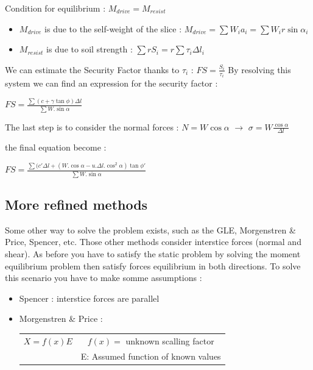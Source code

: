         Condition for equilibrium : $M_{drive} = M_{resist}$
        
        \begin{center}
        \begin{itemize}
            \item $M_{drive}$ is due to the self-weight of the slice : $M_{drive} = \sum W_i  a_i = \sum W_i  r \sin \alpha_i$
            \item $M_{resist}$ is due to soil strength : $\sum r S_i = r \sum \tau_i \Delta l_i$
        \end{itemize}
        \end{center}
        
        We can estimate the Security Factor thanks to $\tau_i$ : $FS = \frac{S_i}{\tau_i}$
        By resolving this system we can find an expression for the security factor : 
        
        \begin{center}
        $FS = \frac{\sum (c+\gamma \tan \phi) \Delta l}{\sum W . \sin \alpha}$ 
        \end{center}
        
        The last step is to consider the normal forces : $N = W \cos \alpha$  $\to$ $\sigma = W \frac{\cos \alpha}{\Delta l}$ 
        
        the final equation become : 
        
        \begin{center}
        $FS = \frac{\sum(c' \Delta l + (W.\cos \alpha - u . \Delta l . \cos^2 \alpha) \tan \phi'}{\sum W. \sin \alpha}$
        \end{center}
        
    \subsection{More refined methods}
    
        Some other way to solve the problem exists, such as the GLE, Morgenstren \& Price, Spencer, etc. Those other methods consider interstice forces (normal and shear). As before you have to satisfy the static problem by solving the moment equilibrium problem then satisfy forces equilibrium in both directions. To solve this scenario you have to make somme assumptions :
        
        \begin{itemize}
            \item Spencer : interstice forces are parallel
            \item Morgenstren \& Price : 
                    \begin{tabular}{c|c}
                    $X = f(x) E$  &  $f(x) =$ unknown scalling factor  \\
                                  &  E: Assumed function of known values 
                \end{tabular}
        \end{itemize}
